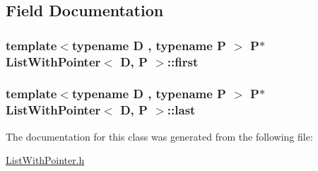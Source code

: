 \subsection{Field Documentation}
\subsubsection[{\texorpdfstring{first}{first}}]{\setlength{\rightskip}{0pt plus 5cm}template$<$typename D , typename P $>$ P$\ast$ {\bf List\+With\+Pointer}$<$ D, P $>$\+::first}\hypertarget{classListWithPointer_a4d39ded7ea1ef992576f70a933414e12}{}\label{classListWithPointer_a4d39ded7ea1ef992576f70a933414e12}
\subsubsection[{\texorpdfstring{last}{last}}]{\setlength{\rightskip}{0pt plus 5cm}template$<$typename D , typename P $>$ P$\ast$ {\bf List\+With\+Pointer}$<$ D, P $>$\+::last}\hypertarget{classListWithPointer_a639d3b9eba9d217b59b19aaa59b291a7}{}\label{classListWithPointer_a639d3b9eba9d217b59b19aaa59b291a7}


The documentation for this class was generated from the following file\+:\begin{DoxyCompactItemize}
\item 
\hyperlink{ListWithPointer_8h}{List\+With\+Pointer.\+h}\end{DoxyCompactItemize}
